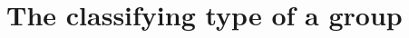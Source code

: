 \documentclass[11pt]{memoir} %
\begin{document}






\chapter{The classifying type of a group}













%

\backmatter

\printbibliography

\printindex
\end{document}
